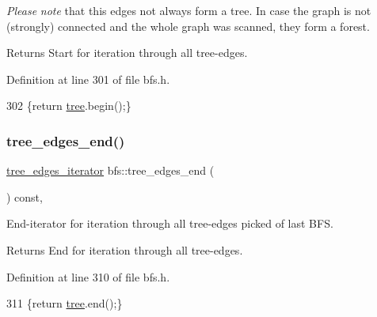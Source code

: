 {\itshape Please} {\itshape note} that this edges not always form a tree. In case the graph is not (strongly) connected and the whole graph was scanned, they form a forest.

\begin{DoxyReturn}{Returns}
Start for iteration through all tree-\/edges. 
\end{DoxyReturn}


Definition at line 301 of file bfs.\+h.


\begin{DoxyCode}
302     \{\textcolor{keywordflow}{return} \mbox{\hyperlink{classbfs_a8bc83afea6d1066ea4ceca3007799912}{tree}}.begin();\}
\end{DoxyCode}
\mbox{\label{classbfs_a7db47d5d68e21e95fd548beea1a8db2b}} 
\subsubsection{\texorpdfstring{tree\+\_\+edges\+\_\+end()}{tree\_edges\_end()}}
{\footnotesize\ttfamily \mbox{\hyperlink{classbfs_a04e608fe18089e5495cadb995aa75261}{tree\+\_\+edges\+\_\+iterator}} bfs\+::tree\+\_\+edges\+\_\+end (\begin{DoxyParamCaption}{ }\end{DoxyParamCaption}) const\hspace{0.3cm}{\ttfamily [inline]}, {\ttfamily [inherited]}}



End-\/iterator for iteration through all tree-\/edges picked of last B\+FS. 

\begin{DoxyReturn}{Returns}
End for iteration through all tree-\/edges. 
\end{DoxyReturn}


Definition at line 310 of file bfs.\+h.


\begin{DoxyCode}
311     \{\textcolor{keywordflow}{return} \mbox{\hyperlink{classbfs_a8bc83afea6d1066ea4ceca3007799912}{tree}}.end();\}
\end{DoxyCode}
\mbox{\label{classbfs_a6e31b8d063a85d92f2b44ff41d2050aa}} 
